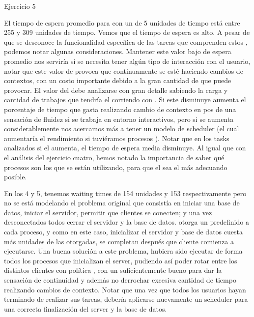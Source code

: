 
\begin{section}{Ejercicio 5}


	El tiempo de espera promedio para  con un  de 5 unidades de tiempo está entre 255 y 309 unidades de tiempo. Vemos que el tiempo de espera es alto. A pesar de que se desconoce la funcionalidad específica de las tareas que comprenden estos , podemos notar algunas consideraciones. Mantener este valor bajo de espera promedio nos serviría si se necesita tener algún tipo de interacción con el usuario, notar que este valor de  provoca que continuamente se esté haciendo cambios de contextos, con un costo importante debido a la gran cantidad de  que puede provocar. El valor del  debe analizarse con gran detalle sabiendo la carga y cantidad de trabajos que tendría el  corriendo con . Si este  disminuye aumenta el porcentaje de tiempo que gasta realizando cambio de contexto en pos de una sensación de fluidez si se trabaja en entorno interactivos, pero si se aumenta considerablemente nos acercamos más a tener un modelo de scheduler  (el cual aumentaría el rendimiento si tuviéramos procesos ). Notar que en los tasks analizados si el  aumenta, el tiempo de espera media disminuye.	Al igual que con el análisis del ejercicio cuatro, hemos notado la importancia de saber qué procesos son los que se están utilizando, para que el  sea el más adecuando posible. 
	
	En los  4 y 5, tenemos waiting times de 154 unidades y 153 respectivamente pero no se está modelando el problema original que consistía en iniciar una base de datos, iniciar el servidor, permitir que clientes se conecten; y una vez desconectados todos cerrar el servidor y la base de datos.  otorga un  predefinido a cada proceso, y como en este caso, inicializar el servidor y base de datos cuesta más unidades de las otorgadas, se completan después que cliente comienza a ejecutarse. Una buena solución a este problema, hubiera sido ejecutar de forma  todos los procesos que inicializan el server, pudiendo así poder rotar entre los distintos clientes con política , con un  suficientemente bueno para dar la sensación de continuidad y además no derrochar excesiva cantidad de tiempo realizando cambios de contexto. Notar que una vez que todos los usuarios hayan terminado de realizar sus tareas, debería aplicarse nuevamente un scheduler  para una correcta finalización del server y la base de datos.

\end{section}

